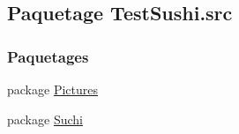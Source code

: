\hypertarget{namespaceTestSushi_1_1src}{}\subsection{Paquetage Test\+Sushi.\+src}
\label{namespaceTestSushi_1_1src}
\subsubsection*{Paquetages}
\begin{DoxyCompactItemize}
\item 
package \hyperlink{namespaceTestSushi_1_1src_1_1Pictures}{Pictures}
\item 
package \hyperlink{namespaceTestSushi_1_1src_1_1Suchi}{Suchi}
\end{DoxyCompactItemize}
